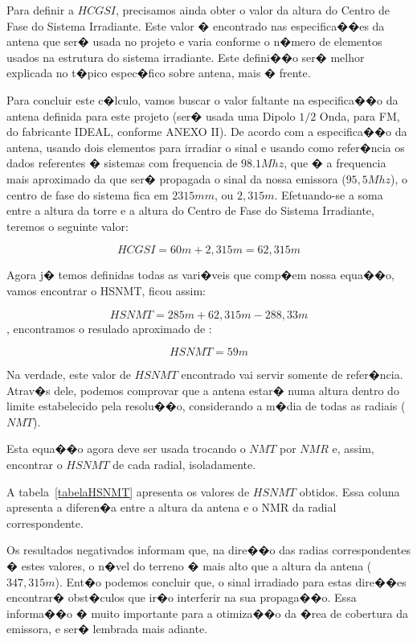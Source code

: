 Para definir a $HCGSI$, precisamos ainda obter o valor da altura do Centro de Fase do Sistema Irradiante. Este valor � encontrado nas especifica��es da 
antena que ser� usada no projeto
 e varia conforme o n�mero de elementos usados na estrutura do sistema irradiante. 
Este defini��o ser� melhor explicada no t�pico espec�fico sobre antena, mais � frente.

Para concluir este c�lculo, vamos buscar o valor faltante na especifica��o
da antena definida para este projeto (ser� usada uma  Dipolo $1/2$ Onda, para FM, do fabricante IDEAL, conforme ANEXO II).
De acordo com a especifica��o da antena, usando dois elementos para irradiar o sinal e usando como refer�ncia os dados referentes � sistemas com frequencia de  $98.1 Mhz$, que �
a frequencia mais aproximado da que ser� propagada o sinal da nossa emissora ($95,5 Mhz$), o centro de fase do sistema fica em $2315mm$, ou $2,315m$.
 Efetuando-se a soma entre a 
altura da torre e a altura do Centro de Fase do Sistema Irradiante, teremos o seguinte valor: 

$$HCGSI = 60m + 2,315m = 62,315m$$ 

Agora j� temos definidas todas as vari�veis que comp�em nossa equa��o, vamos encontrar o HSNMT, ficou assim:

$$HSNMT = 285m + 62,315m - 288,33 m$$, encontramos o resulado aproximado de :

$$HSNMT = 59m $$

Na verdade, este valor de $HSNMT$ encontrado vai servir somente de refer�ncia. Atrav�s dele, podemos comprovar que a antena estar� numa altura dentro do
 limite estabelecido
pela resolu��o, considerando a m�dia de todas as radiais ($NMT$).


Esta equa��o agora deve ser usada trocando o $NMT$ por $NMR$ e, assim, encontrar o $HSNMT$ de cada radial, isoladamente.

A tabela~\ref{tabelaHSNMT} apresenta os valores de $HSNMT$ obtidos. Essa coluna apresenta a diferen�a entre a altura da antena e o NMR da radial 
correspondente. 

Os resultados negativados informam que, na dire��o das radias correspondentes � estes valores, o n�vel do terreno � mais alto
que a altura da antena ($347,315m$). Ent�o podemos concluir que, o sinal irradiado para estas dire��es encontrar� obst�culos que ir�o interferir na sua 
propaga��o.
Essa informa��o � muito importante para a otimiza��o da �rea de cobertura da emissora, e ser� lembrada mais adiante.


